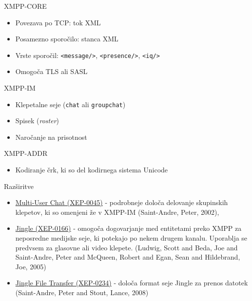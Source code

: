 \documentclass[presentation]{beamer}
\begin{document}
\begin{frame}[label={sec:org2dfbaca},fragile]{XMPP-CORE}
 \begin{itemize}
\item Povezava po TCP: tok XML
\item Posamezno sporočilo: stanca XML
\item Vrste sporočil: \texttt{<message/>}, \texttt{<presence/>}, \texttt{<iq/>}
\item Omogoča TLS ali SASL
\end{itemize}
\end{frame}

\begin{frame}[label={sec:orga1eb00d},fragile]{XMPP-IM}
 \begin{itemize}
\item Klepetalne seje (\texttt{chat} ali \texttt{groupchat})
\item Spisek (\emph{roster})
\item Naročanje na prisotnost
\end{itemize}
\end{frame}

\begin{frame}[label={sec:org7b82a12}]{XMPP-ADDR}
\begin{itemize}
\item Kodiranje črk, ki so del kodirnega sistema Unicode
\end{itemize}
\end{frame}

\begin{frame}[label={sec:orgbc13993}]{Razširitve}
\begin{itemize}
\item \href{https://xmpp.org/extensions/xep-0045.html}{Multi-User Chat (XEP-0045)} - podrobneje določa delovanje skupinskih
klepetov, ki so omenjeni že v XMPP-IM (Saint-Andre, Peter, 2002),
\item \href{https://xmpp.org/extensions/xep-0166.html}{Jingle (XEP-0166)} - omogoča dogovarjanje med entitetami preko XMPP
za neposredne medijske seje, ki potekajo po nekem drugem
kanalu. Uporablja se predvsem za glasovne ali video
klepete. (Ludwig, Scott and Beda, Joe and Saint-Andre, Peter and McQueen, Robert and Egan, Sean and Hildebrand, Joe, 2005)
\item \href{https://xmpp.org/extensions/xep-0234.html}{Jingle File Transfer (XEP-0234)} - določa format seje Jingle za
prenos datotek (Saint-Andre, Peter and Stout, Lance, 2008)
\end{itemize}
\end{frame}
\end{document}
